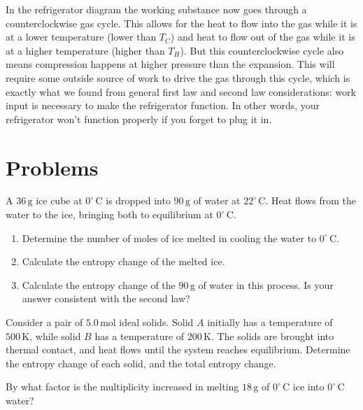 In the refrigerator diagram the working substance now goes
through a counterclockwise gas cycle.  This allows for the heat to
flow into the gas while it is at a lower temperature (lower than
$T_C$) and heat to flow out of the gas while it is at a higher
temperature (higher than $T_H$).  But this counterclockwise cycle also
means compression happens at higher pressure than the expansion.  This
will require some outside source of work to drive the gas through this
cycle, which is exactly what we found from general first law and
second law considerations: work input is necessary to make the
refrigerator function.  In other words, your refrigerator won't function
properly if you forget to plug it in.





\section*{Problems}

\begin{exercise} 
  A $36\,\text{g}$ ice cube at $0^\circ\,\text{C}$ is dropped into
  $90\,\text{g}$ of water at $22^\circ\,\text{C}$.  Heat flows from the
  water to the ice, bringing both to equilibrium at
  $0^\circ\,\text{C}$.
  \begin{enumerate}
  \item Determine the number of moles of ice melted in cooling the
    water to $0^\circ\,\text{C}$.
  \item Calculate the entropy change of the melted ice.
  \item Calculate the entropy change of the $90\,\text{g}$ of water 
   in this process.  Is your answer consistent
    with the second law?
  \end{enumerate}
\label{prob:iceintowater}
\end{exercise}

\begin{exercise}
  Consider a pair of $5.0\,\text{mol}$ ideal solids.  Solid $A$ initially has
  a temperature of $500\,\text{K}$, while solid $B$ has a temperature of
  $200\,\text{K}$.  The solids are brought into thermal contact, and
  heat flows until the system reaches equilibrium.
  Determine the entropy change of each solid, and the total entropy
  change. 
\end{exercise}

\begin{exercise}
  By what factor is the multiplicity increased in melting
  $18\,\text{g}$ of $0^\circ\,\text{C}$ ice into $0^\circ\,\text{C}$ water?
\label{prob:multiplicityformelting}
\end{exercise}

